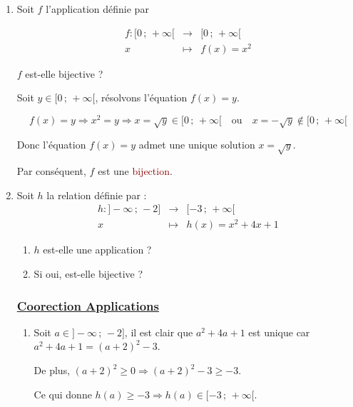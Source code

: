 \documentclass[12pt,a4paper]{article}
\begin{document}
\begin{enumerate}

    \item Soit $f$ l'application  définie par
    
\[
\begin{array}{rcl}
f:[0\,;\,+\infty[ & \longrightarrow & [0\,;\,+\infty[\\
x                 & \longmapsto      & f(x)=x^2
\end{array}
\]

    $f$ est-elle bijective ?

    Soit $y\in[0\,;\,+\infty[$, résolvons l'équation $f(x)=y$.

    \[
    f(x)=y
    \Longrightarrow x^2=y
    \Longrightarrow x=\sqrt{y}\in[0\,;\,+\infty[\quad \text{ou}\quad x=-\sqrt{y}\notin[0\,;\,+\infty[
    \]

    Donc l'équation $f(x)=y$ admet une unique solution $x=\sqrt{y}.$

    Par conséquent, $f$ est une \textcolor{darkred}{bijection}.


    \item Soit $h$ la relation définie par :
    \[
	\begin{array}{rcl}
	h:]-\infty\,;\,-2] & \longrightarrow & [-3\,;\,+\infty[\\
		x                 & \longmapsto      & h(x)=x^2+4x+1
	\end{array}
	\]

    \begin{enumerate}
        \item $h$ est-elle une application ?

        \item Si oui, est-elle bijective ?
    \end{enumerate}

\subsubsection*{\underline{\textbf{Coorection Applications}}}
    \begin{enumerate}

        \item Soit $a\in]-\infty\,;\,-2]$, il est clair que
        $a^2+4a+1$ est unique car $ a^2+4a+1=(a+2)^2-3. $

        De plus,
        $
            (a+2)^2\geq 0
            \Longrightarrow
            (a+2)^2-3\geq -3.
        $

        Ce qui donne
        $
            h(a)\geq -3
            \Longrightarrow
            h(a)\in[-3\,;\,+\infty[.
        $


\end{enumerate}
\end{enumerate}
\end{document}

